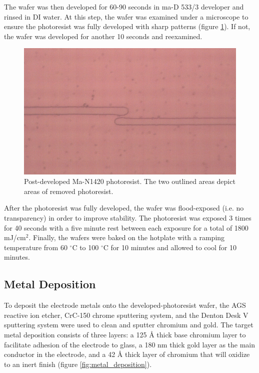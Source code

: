 \par The wafer was then developed for 60-90 seconds in  ma-D 533/3 developer and rinsed in DI water. At this step, the wafer was examined under a microscope to ensure the photoresist was fully developed with sharp patterns (figure \ref{fig:photoresist_microscope}). If not, the wafer was developed for another 10 seconds and reexamined. 

\begin{figure}[h]
    \centering
    \includegraphics[width=\textwidth]{images/microscope_photoresist.png}
    \caption[Post-developed Ma-N1420 photoresist]{Post-developed Ma-N1420 photoresist. The two outlined areas depict areas of removed photoresist.}
    \label{fig:photoresist_microscope}
\end{figure}

\par After the photoresist was fully developed, the wafer was flood-exposed (i.e. no transparency) in order to improve stability. The photoresist was exposed 3 times for 40 seconds with a five minute rest between each exposure for a total of 1800 mJ/cm$^2$. Finally, the wafers were baked on the hotplate with a ramping temperature from 60 $^\circ$C to 100 $^\circ$C for 10 minutes and allowed to cool for 10 minutes. 

\subsection*{Metal Deposition}

\par To deposit the electrode metals onto the developed-photoresist wafer, the AGS reactive ion etcher, CrC-150 chrome sputtering system, and the Denton Desk V sputtering system were used to clean and sputter chromium and gold. The target metal deposition consists of three layers: a 125 \si{\angstrom} thick base chromium layer to facilitate adhesion of the electrode to glass, a 180 nm thick gold layer as the main conductor in the electrode, and a 42 \si{\angstrom} thick layer of chromium that will oxidize to an inert finish (figure \ref{fig:metal_deposition}).

